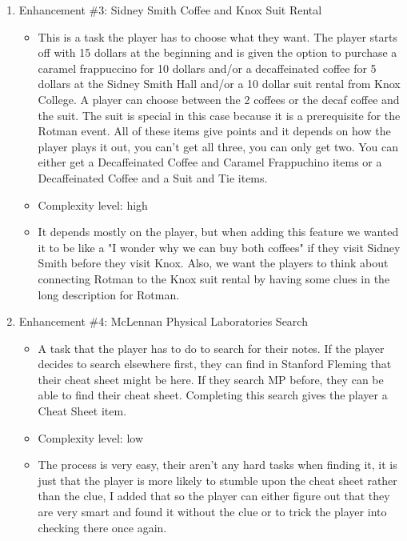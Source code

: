 \documentclass[11pt]{article}
\begin{document}
\begin{enumerate}
\item Enhancement \#3: Sidney Smith Coffee and Knox Suit Rental
	\begin{itemize}
	\item This is a task the player has to choose what they want. The player starts off with 15 dollars at the beginning and is given the option to purchase a caramel frappuccino for 10 dollars and/or a decaffeinated coffee for 5 dollars at the Sidney Smith Hall and/or a 10 dollar suit rental from Knox College. A player can choose between the 2 coffees or the decaf coffee and the suit. The suit is special in this case because it is a prerequisite for the Rotman event. All of these items give points and it depends on how the player plays it out, you can't get all three, you can only get two. You can either get a Decaffeinated Coffee and Caramel Frappuchino items or a Decaffeinated Coffee and a Suit and Tie items.
	\item Complexity level: high
	\item It depends mostly on the player, but when adding this feature we wanted it to be like a "I wonder why we can buy both coffees" if they visit Sidney Smith before they visit Knox. Also, we want the players to think about connecting Rotman to the Knox suit rental by having some clues in the long description for Rotman.
    \end{itemize}
    
\item Enhancement \#4: McLennan Physical Laboratories Search
	\begin{itemize}
	\item A task that the player has to do to search for their notes. If the player decides to search elsewhere first, they can find in Stanford Fleming that their cheat sheet might be here. If they search MP before, they can be able to find their cheat sheet. Completing this search gives the player a Cheat Sheet item.
	\item Complexity level: low
	\item The process is very easy, their aren't any hard tasks when finding it, it is just that the player is more likely to stumble upon the cheat sheet rather than the clue, I added that so the player can either figure out that they are very smart and found it without the clue or to trick the player into checking there once again.
	\end{itemize}


\end{enumerate}
\end{document}

